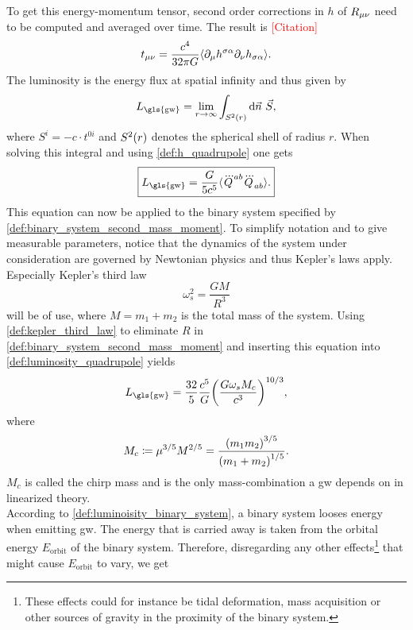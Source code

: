 To get this energy-momentum tensor, second order corrections in $h$ of $R_{\mu\nu}$ need to be computed and averaged over time. The result is \textcolor{red}{[Citation]}
\begin{equation}
t_{\mu\nu} = \frac{c^4}{32\pi G}\langle\partial_\mu h^{\sigma\alpha}\partial_\nu h_{\sigma\alpha}\rangle.
\end{equation}
The luminosity is the energy flux at spatial infinity and thus given by
\begin{equation}
L_\text{\gls{gw}} = \lim_{r\to\infty}\int_{S^2\lr{r}}\diff\vec{n}\ \vec{S},
\end{equation}
where $S^i=-c\cdot t^{0i}$ and $S^2{\left( r \right)}$ denotes the spherical shell of radius $r$. When solving this integral and using \eqref{def:h_quadrupole} one gets
\begin{equation}\label{def:luminosity_quadrupole}
\boxed{L_\text{\gls{gw}}=\frac{G}{5c^5}\langle\dddot{Q}^{ab}\dddot{Q}_{ab}\rangle.}
\end{equation}
This equation can now be applied to the binary system specified by \eqref{def:binary_system_second_mass_moment}. To simplify notation and to give measurable parameters, notice that the dynamics of the system under consideration are governed by Newtonian physics and thus Kepler's laws apply. Especially Kepler's third law
\begin{equation}\label{def:kepler_third_law}
\omega_s^2=\frac{G M}{R^3}
\end{equation}
will be of use, where $M=m_1+m_2$ is the total mass of the system. Using \eqref{def:kepler_third_law} to eliminate $R$ in \eqref{def:binary_system_second_mass_moment} and inserting this equation into \eqref{def:luminosity_quadrupole} yields
\begin{equation}\label{def:luminoisity_binary_system}
L_\text{\gls{gw}}=\frac{32}{5}\frac{c^5}{G}\lr{\frac{G\omega_s M_c}{c^3}}^{10/3},
\end{equation}
where
\begin{equation}
M_c\coloneqq \mu^{3/5}M^{2/5}=\frac{{\left( m_1 m_2 \right)}^{3/5}}{{\left( m_1 + m_2 \right)}^{1/5}}.
\end{equation}
$M_c$ is called the chirp mass and is the only mass-combination a \gls{gw} depends on in linearized theory.\medskip\\
According to \eqref{def:luminoisity_binary_system}, a binary system looses energy when emitting \gls{gw}. The energy that is carried away is taken from the orbital energy $E_\text{orbit}$ of the binary system. Therefore, disregarding any other effects\footnote{These effects could for instance be tidal deformation, mass acquisition or other sources of gravity in the proximity of the binary system.} that might cause $E_\text{orbit}$ to vary, we get
